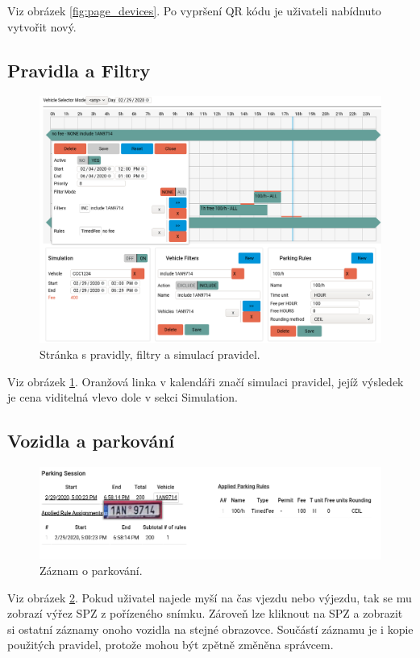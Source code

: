 Viz obrázek \ref{fig:page_devices}.
Po vypršení QR kódu je uživateli nabídnuto vytvořit nový.

\subsection*{Pravidla a Filtry}

\begin{figure}[!htb] \centering
  \includegraphics[width=145mm]{../img/page_rules.png}
  \caption{Stránka s pravidly, filtry a simulací pravidel.}
  \label{fig:page_rules}
\end{figure}

Viz obrázek \ref{fig:page_rules}.
Oranžová linka v kalendáři značí simulaci pravidel, jejíž výsledek je cena viditelná vlevo
dole v sekci Simulation.

\subsection*{Vozidla a parkování}

\begin{figure}[!htb] \centering
  \includegraphics[width=145mm]{../img/page_vehicles1.png}
  \caption{Záznam o parkování.}
  \label{fig:page_session}
\end{figure}

Viz obrázek \ref{fig:page_session}.
Pokud uživatel najede myší na čas vjezdu nebo výjezdu, tak se mu zobrazí výřez SPZ z pořízeného snímku.
Zároveň lze kliknout na SPZ a zobrazit si ostatní záznamy onoho vozidla na stejné obrazovce.
Součástí záznamu je i kopie použitých pravidel, protože mohou být zpětně změněna správcem.
